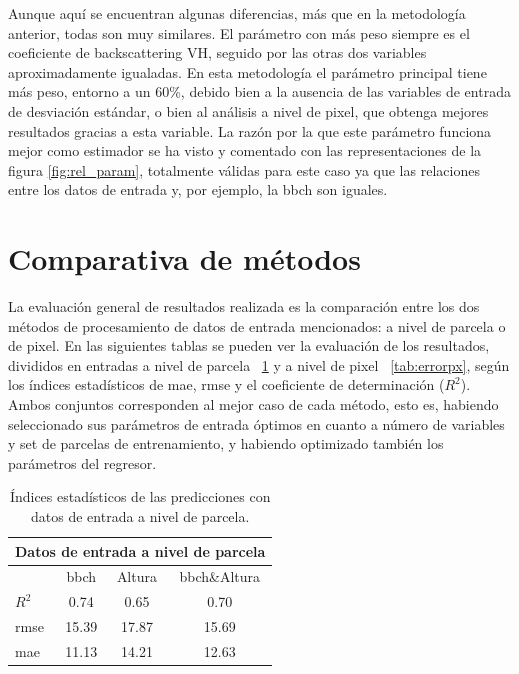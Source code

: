 \par Aunque aquí se encuentran algunas diferencias, más que en la metodología anterior, todas son muy similares. El parámetro con más peso siempre es el coeficiente de backscattering VH, seguido por las otras dos variables aproximadamente igualadas. En esta metodología el parámetro principal tiene más peso, entorno a un 60\%, debido bien a la ausencia de las variables de entrada de desviación estándar, o bien al análisis a nivel de pixel, que obtenga mejores resultados gracias a esta variable. La razón por la que este parámetro funciona mejor como estimador se ha visto y comentado con las representaciones de la figura \ref{fig:rel_param}, totalmente válidas para este caso ya que las relaciones entre los datos de entrada y, por ejemplo, la \gls{bbch} son iguales.
\section{Comparativa de métodos}
\par La evaluación general de resultados realizada es la comparación entre los dos métodos de procesamiento de datos de entrada mencionados: a nivel de parcela o de pixel. En las siguientes tablas se pueden ver la evaluación de los resultados, divididos en entradas a nivel de parcela ~\ref{tab:errorpc} y a nivel de pixel ~\ref{tab:errorpx}, según los índices estadísticos de \gls{mae}, \gls{rmse} y el coeficiente de determinación ($R^2$). Ambos conjuntos corresponden al mejor caso de cada método, esto es, habiendo seleccionado sus parámetros de entrada óptimos en cuanto a número de variables y set de parcelas de entrenamiento, y habiendo optimizado también los parámetros del regresor.

\begin{table}[h]
\centering
\begin{tabular}{lccc}
\multicolumn{4}{c}{Datos de entrada a nivel de parcela}                            \\ \hline \hline
\multicolumn{1}{l|}{}                            & \gls{bbch}  & Altura & \gls{bbch}\&Altura \\ \cline{2-4} 
\multicolumn{1}{l|}{$R^2$}                       & 0.74  & 0.65   & 0.70 \\
\multicolumn{1}{l|}{\gls{rmse}} 				 & 15.39 & 17.87  & 15.69 \\
\multicolumn{1}{l|}{\gls{mae}}  				 & 11.13 & 14.21  & 12.63       
\end{tabular}
\caption{Índices estadísticos de las predicciones con datos de entrada a nivel de parcela. \label{tab:errorpc}}
\end{table}

